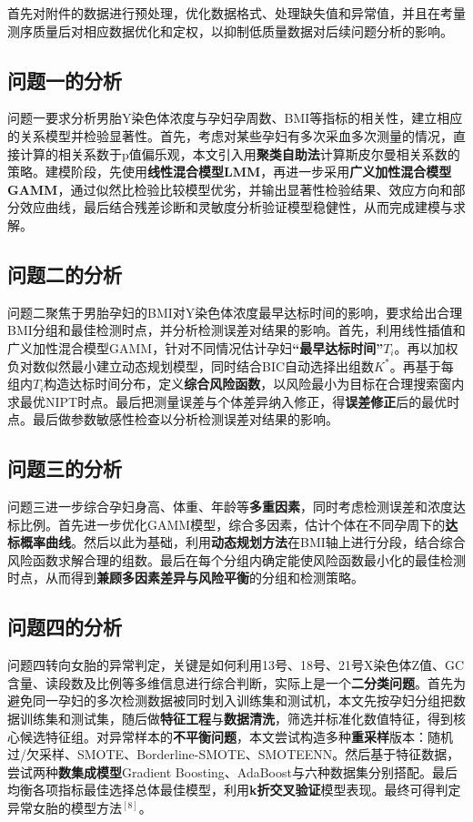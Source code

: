 首先对附件的数据进行预处理，优化数据格式、处理缺失值和异常值，并且在考量测序质量后对相应数据优化和定权，以抑制低质量数据对后续问题分析的影响。

\subsection{问题一的分析}


问题一要求分析男胎Y染色体浓度与孕妇孕周数、BMI等指标的相关性，建立相应的关系模型并检验显著性。首先，考虑对某些孕妇有多次采血多次测量的情况，直接计算的相关系数于p值偏乐观，本文引入用\textbf{聚类自助法}计算斯皮尔曼相关系数的策略。建模阶段，先使用\textbf{线性混合模型LMM}，再进一步采用\textbf{广义加性混合模型GAMM}，通过似然比检验比较模型优劣，并输出显著性检验结果、效应方向和部分效应曲线，最后结合残差诊断和灵敏度分析验证模型稳健性，从而完成建模与求解。

\subsection{问题二的分析}

问题二聚焦于男胎孕妇的BMI对Y染色体浓度最早达标时间的影响，要求给出合理BMI分组和最佳检测时点，并分析检测误差对结果的影响。首先，利用线性插值和广义加性混合模型GAMM，针对不同情况估计孕妇\textbf{“最早达标时间”$T_i$}。再以加权负对数似然最小建立动态规划模型，同时结合BIC自动选择出组数$K^*$。再基于每组内$T_i$构造达标时间分布，定义\textbf{综合风险函数}，以风险最小为目标在合理搜索窗内求最优NIPT时点。最后把测量误差与个体差异纳入修正，得\textbf{误差修正}后的最优时点。最后做参数敏感性检查以分析检测误差对结果的影响。


\subsection{问题三的分析}

问题三进一步综合孕妇身高、体重、年龄等\textbf{多重因素}，同时考虑检测误差和浓度达标比例。首先进一步优化GAMM模型，综合多因素，估计个体在不同孕周下的\textbf{达标概率曲线}。然后以此为基础，利用\textbf{动态规划方法}在BMI轴上进行分段，结合综合风险函数求解合理的组数。最后在每个分组内确定能使风险函数最小化的最佳检测时点，从而得到\textbf{兼顾多因素差异与风险平衡}的分组和检测策略。

\subsection{问题四的分析}

问题四转向女胎的异常判定，关键是如何利用13号、18号、21号X染色体Z值、GC含量、读段数及比例等多维信息进行综合判断，实际上是一个\textbf{二分类问题}。首先为避免同一孕妇的多次检测数据被同时划入训练集和测试机，本文先按孕妇分组把数据训练集和测试集，随后做\textbf{特征工程}与\textbf{数据清洗}，筛选并标准化数值特征，得到核心候选特征组。对异常样本的\textbf{不平衡问题}，本文尝试构造多种\textbf{重采样}版本：随机过/欠采样、SMOTE、Borderline-SMOTE、SMOTEENN。然后基于特征数据，尝试两种\textbf{数集成模型}Gradient Boosting、AdaBoost与六种数据集分别搭配。最后均衡各项指标最佳选择总体最佳模型，利用\textbf{k折交叉验证}模型表现。最终可得判定异常女胎的模型方法$^{[8]}$。
